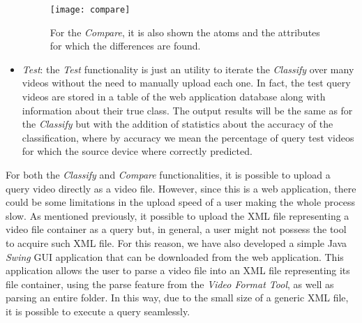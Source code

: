 \begin{itemize}
\begin{figure}
  \centering
  \texttt{[image: compare]}
  \caption{For the \emph{Compare}, it is also shown the atoms and the attributes for which the differences are found.}\label{fig:compare}
\end{figure}

\item \emph{Test}: the \emph{Test} functionality is just an utility to iterate the \emph{Classify} over many videos without the need to manually upload each one. In fact, the test query videos are stored in a table of the web application database along with information about their true class. The output results will be the same as for the \emph{Classify} but with the addition of statistics about the accuracy of the classification, where by accuracy we mean the percentage of query test videos for which the source device where correctly predicted.

\end{itemize}

For both the \emph{Classify} and \emph{Compare} functionalities, it is possible to upload a query video directly as a video file. However, since this is a web application, there could be some limitations in the upload speed of a user making the whole process slow. As mentioned previously, it possible to upload the XML file representing a video file container as a query but, in general, a user might not possess the tool to acquire such XML file. For this reason, we have also developed a simple Java \emph{Swing} GUI application that can be downloaded from the web application. This application allows the user to parse a video file into an XML file representing its file container, using the parse feature from the \emph{Video Format Tool}, as well as parsing an entire folder. In this way, due to the small size of a generic XML file, it is possible to execute a query seamlessly.
